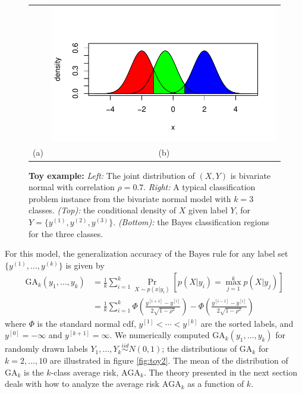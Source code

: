 \documentclass[twoside,11pt]{article}
\begin{document}
\begin{figure}[h]
\begin{tabular}{cc}
 &  \includegraphics[scale = 0.5, clip = true, trim = 0 0 0 0.5in]{illus_example1b.pdf}\\
(a) & (b)
\end{tabular}

\caption{\textbf{Toy example:}
\emph{Left:} The joint distribution of $(X, Y)$ is bivariate normal with correlation $\rho = 0.7$.
\emph{Right:} A typical classification problem instance from the bivariate normal model with $k = 3$ classes.
\emph{(Top):} the conditional density of $X$ given label $Y$, for $Y = \{y^{(1)}, y^{(2)}, y^{(3)}\}$.
\emph{(Bottom):} the Bayes classification regions for the three classes.}\label{fig:toy1}
\end{figure}

For this model, the generalization accuracy of the Bayes rule for any
label set $\{y^{(1)},\hdots, y^{(k)}\}$ is given by
\begin{align*}
\text{GA}_k(y_1,\hdots, y_k) &= \frac{1}{k}\sum_{i=1}^k \Pr_{X \sim p(x|y_i)}[p(X|y_i) = \max_{j=1}^k p(X|y_j)]
\\&= \frac{1}{k}\sum_{i=1}^k \Phi\left(\frac{y^{[i+1]} - y^{[i]}}{2\sqrt{1-\rho^2}}\right) - \Phi\left(\frac{y^{[i-1]} - y^{[i]}}{2\sqrt{1-\rho^2}}\right)
\end{align*}
where $\Phi$ is the standard normal cdf, $y^{[1]} < \cdots < y^{[k]}$
are the sorted labels, and $y^{[0]} = -\infty$ and $y^{[k+1]} =
\infty$.  We numerically computed $\text{GA}_k(y_1,\hdots, y_k)$ for
randomly drawn labels $Y_1,\hdots, Y_k \stackrel{iid}{\sim} N(0, 1)$;
the distributions of $\text{GA}_k$ for $k = 2,\hdots, 10$ are
illustrated in figure \ref{fig:toy2}.  The mean of the distribution of
$\text{GA}_k$ is the $k$-class average risk, $\text{AGA}_k$. The
theory presented in the next section deals with how to analyze the
average risk $\text{AGA}_k$ as a function of $k$.
\end{document}
